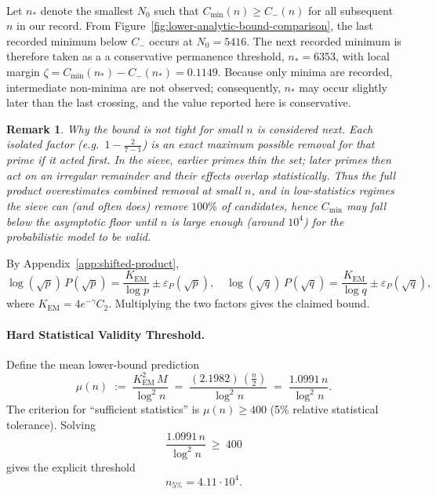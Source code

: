 \documentclass[11pt]{article}
\makeatletter
\theoremstyle{inline}
\newtheorem*{remark}{Remark}
\theoremstyle{break}
\renewenvironment{proof}[1][\proofname]{%
  \par\pushQED{\qed}%
  \normalfont \topsep6\p@\@plus6\p@\relax
  \trivlist
  \item[\hskip\labelsep
        \itshape
    #1\@addpunct{.}]\mbox{}\\  %
}{%
  \popQED\endtrivlist\@endpefalse
}
\theoremstyle{break}
\theoremstyle{break}
\theoremstyle{break}
\theoremstyle{break}
\theoremstyle{break}
\theoremstyle{break}
\theoremstyle{inline}
\newcommand{\xPreMertens}{5416} %
\newcommand{\xMertens}{6353} %
\newcommand{\xDeltaMertens}{0.1149}  %
\newcommand{\Cmeas}{C}              %
\newcommand{\CminusProduct}{C_{-}}
\newcommand{\Kem}{K_{\mathrm{EM}}}              %
\newcommand{\nprodstar}{n_{\ast}}  %
\makeatother
\begin{document}
\begin{proof}
Let \(\nprodstar\) denote the smallest \(N_0\) such that \(\Cmeas_{\min}(n) \ge \CminusProduct(n)\) for all subsequent \(n\) in our record.
From Figure~\ref{fig:lower-analytic-bound-comparison}, the last recorded minimum below \(\CminusProduct\) occurs at \(N_0 = \xPreMertens \).
The next recorded minimum is therefore taken as a
a conservative permanence threshold, \(\nprodstar = \xMertens\), with local margin
\(\zeta = \Cmeas_{\min}(\nprodstar) - \CminusProduct(\nprodstar) = \xDeltaMertens \).
Because only minima are recorded, intermediate non-minima are not observed; consequently, \(\nprodstar\) may occur slightly later than
the last crossing, and the value reported here is conservative.

\begin{remark}
Why the bound is not tight for small \(n\) is considered next.
Each isolated factor (e.g.\ \(1-\tfrac{2}{7-1}\)) is an exact maximum possible removal for that prime \emph{if} it acted first.
In the sieve, earlier primes thin the set; later primes then act on an irregular remainder and their effects overlap statistically.
Thus the full product overestimates combined removal at small \(n\), and in low-statistics regimes the sieve can (and often does)
remove \(100\%\) of candidates, hence \(\Cmeas_{\min}\) may fall below the asymptotic floor until \(n\) is large enough
(around \(10^4\)) for the probabilistic model to be valid.
\end{remark}

By Appendix~\ref{app:shifted-product},
\begin{equation}
\log(\sqrt{p})\,P(\sqrt{p}) = \frac{\Kem}{\log p} \pm \varepsilon_P(\sqrt{p}),
\quad
\log(\sqrt{q})\,P(\sqrt{q}) = \frac{\Kem}{\log q} \pm \varepsilon_P(\sqrt{q}),
\end{equation}
where \( \Kem = 4 e^{-\gamma} C_2 \).
Multiplying the two factors gives the claimed bound.

\paragraph{Hard Statistical Validity Threshold.}
Define the mean lower-bound prediction
\begin{equation}
\mu(n)\;:=\;\frac{\Kem^2\,M}{\log^2 n}
\;=\;\frac{(2.1982)\,\left(\frac{n}{2}\right)}{\log^2 n}
\;=\;\frac{1.0991\,n}{\log^2 n}.
\end{equation}
The criterion for “sufficient statistics” is \(\mu(n)\ge 400\) (5\% relative statistical tolerance). Solving
\begin{equation}
\frac{1.0991\,n}{\log^2 n}\ \ge\ 400
\end{equation}
gives the explicit threshold
\begin{equation}
n_{5\%}=4.11\cdot 10^{4}.
\end{equation}


\end{proof}
\end{document}
